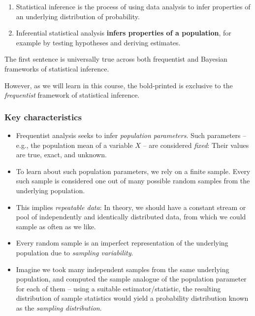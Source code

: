 \documentclass[
  11pt,
]{article}
\providecommand{\tightlist}{%
  \setlength{\itemsep}{0pt}\setlength{\parskip}{0pt}}
\begin{document}
\begin{enumerate}
\def\labelenumi{\arabic{enumi}.}
\tightlist
\item
  Statistical inference is the process of using data analysis to infer properties of an underlying distribution of probability.
\item
  Inferential statistical analysis \textbf{infers properties of a population}, for example by testing hypotheses and deriving estimates.
\end{enumerate}

The first sentence is universally true across both frequentist and Bayesian frameworks of statistical inference.

However, as we will learn in this course, the bold-printed is exclusive to the \emph{frequentist} framework of statistical inference.

\hypertarget{key-characteristics}{%
\subsubsection{Key characteristics}\label{key-characteristics}}

\begin{itemize}
\tightlist
\item
  Frequentist analysis seeks to infer \emph{population parameters}. Such parameters -- e.g., the population mean of a variable \(X\) -- are considered \emph{fixed}: Their values are true, exact, and unknown.
\item
  To learn about such population parameters, we rely on a finite sample. Every such sample is considered one out of many possible random samples from the underlying population.
\item
  This implies \emph{repeatable data}: In theory, we should have a constant stream or pool of independently and identically distributed data, from which we could sample as often as we like.
\item
  Every random sample is an imperfect representation of the underlying population due to \emph{sampling variability}.
\item
  Imagine we took many independent samples from the same underlying population, and computed the sample analogue of the population parameter for each of them -- using a suitable estimator/statistic, the resulting distribution of sample statistics would yield a probability distribution known as the \emph{sampling distribution}.
\end{itemize}
\end{document}

